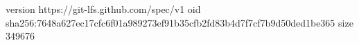 version https://git-lfs.github.com/spec/v1
oid sha256:7648a627ec17cfc6f01a989273ef91b35cfb2fd83b4d7f7cf7b9d50ded1be365
size 349676
